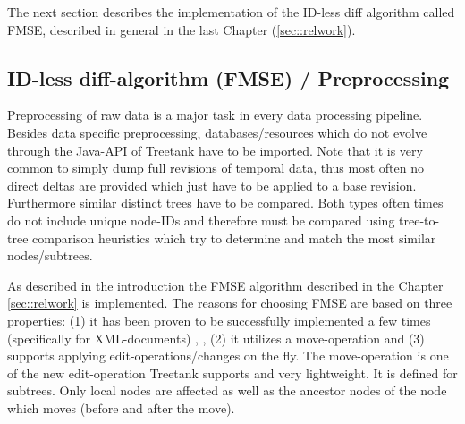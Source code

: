 
The next section describes the implementation of the ID-less diff algorithm called FMSE, described in general in the last Chapter (\ref{sec::relwork}).

\subsection{ID-less diff-algorithm (FMSE) / Preprocessing}
Preprocessing of raw data is a major task in every data processing pipeline. Besides data specific preprocessing, databases/resources which do not evolve through the Java-API of Treetank have to be imported. Note that it is very common to simply dump full revisions of temporal data, thus most often no direct deltas are provided which just have to be applied to a base revision. Furthermore similar distinct trees have to be compared. Both types often times do not include unique node-IDs and therefore must be compared using tree-to-tree comparison heuristics which try to determine and match the most similar nodes/subtrees. %

As described in the introduction the FMSE algorithm described in the Chapter \ref{sec::relwork} is implemented. The reasons for choosing FMSE are based on three properties: (1) it has been proven to be successfully implemented a few times (specifically for XML-documents) \cite{xmldiff}, \cite{diffxml}, (2) it utilizes a move-operation and (3) supports applying edit-operations/changes on the fly. The move-operation is one of the new edit-operation Treetank supports and very lightweight. It is defined for subtrees. Only local nodes are affected as well as the ancestor nodes of the node which moves (before and after the move). 

